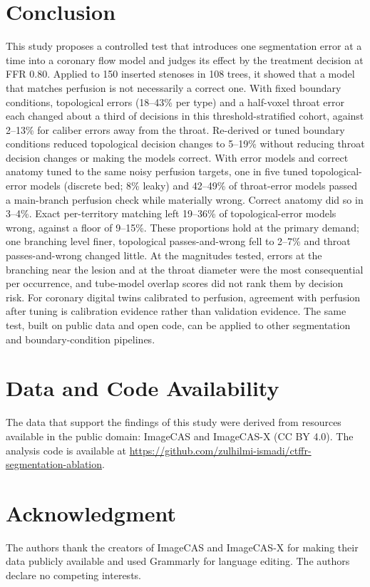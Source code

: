\documentclass[journal,twoside,web]{ieeecolor}
\begin{document}
\section{Conclusion}
This study proposes a controlled test that introduces one segmentation error at a time into a coronary flow model and judges
its effect by the treatment decision at FFR 0.80. Applied to 150 inserted stenoses in 108 trees, it showed that a model that matches
perfusion is not necessarily a correct one. With fixed boundary conditions, topological errors (18--43\% per type) and a half-voxel throat error each changed about a third of decisions in this threshold-stratified cohort, against 2--13\% for caliber errors away from the throat. Re-derived or tuned boundary conditions reduced topological decision changes to 5--19\% without reducing throat decision changes or making the models correct. With error models and correct anatomy tuned to the same noisy perfusion targets, one in five tuned topological-error models (discrete bed; 8\% leaky) and 42--49\% of throat-error models passed a main-branch perfusion check while materially wrong. Correct anatomy did so in 3--4\%. Exact per-territory matching left 19--36\% of topological-error models wrong, against a floor of 9--15\%. These proportions hold at the primary demand; one branching level finer, topological passes-and-wrong fell to 2--7\% and throat passes-and-wrong changed little. At the magnitudes tested, errors at the branching near the lesion and at the throat diameter were the most consequential per occurrence, and tube-model overlap scores did not rank them by decision risk.
For coronary digital twins calibrated to perfusion, agreement with perfusion after tuning is calibration evidence
rather than validation evidence. The same test, built on public data and open code, can be applied to other segmentation and
boundary-condition pipelines.

\section*{Data and Code Availability}
The data that support the findings of this study were derived from resources available in the public domain: ImageCAS \cite{zeng2023} and ImageCAS-X \cite{imagecasx_data} (CC BY 4.0). The analysis code is available at \url{https://github.com/zulhilmi-ismadi/ctffr-segmentation-ablation}.

\section*{Acknowledgment}
The authors thank the creators of ImageCAS and ImageCAS-X for making their data publicly available and used Grammarly for language editing. The authors declare no competing interests.
\end{document}
